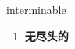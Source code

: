 
\begin{frame}
{\huge interminable}
\begin{center}
\begin{enumerate}\Large
  \item \textbf{无尽头的}
\end{enumerate}
\end{center}
\end{frame}
